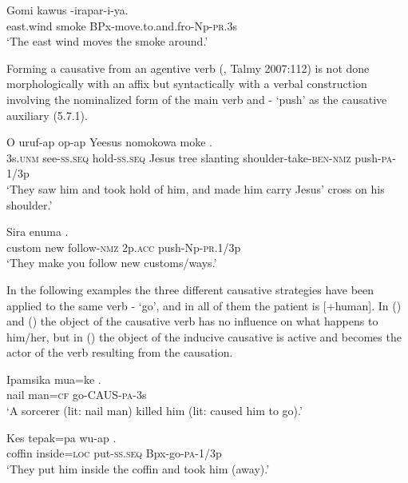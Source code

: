 \ea%
\label{ex:x1000}
\gll Gomi kawus -irapar-i-ya. \\
east.wind smoke BPx-move.to.and.fro-Np-\textsc{pr}.3s\\
\glt`The east wind moves the smoke around.'
\z

Forming a causative from an agentive verb (, Talmy 2007:112) is not done morphologically with an affix but syntactically with a verbal construction involving the nominalized form of the main verb and - `push' as the causative auxiliary (5.7.1). 

\ea%
\label{ex:x1003}
\gll O uruf-ap op-ap Yeesus nomokowa moke  .\\
3s.\textsc{unm} see-\textsc{ss}.\textsc{seq} hold-\textsc{ss}.\textsc{seq} Jesus tree slanting shoulder-take-\textsc{ben}-\textsc{nmz} push-\textsc{pa}-1/3p\\
\glt`They saw him and took hold of him, and made him carry Jesus' cross on his shoulder.'
\z

\ea%
\label{ex:x1002}
\gll Sira enuma   . \\
custom new follow-\textsc{nmz} 2p.\textsc{acc} push-Np-\textsc{pr}.1/3p\\
\glt`They make you follow new customs/ways.'
\z

In the following examples the three different causative strategies have been applied to the same verb - `go', and in all of them the patient is [+human]. In () and () the object of the causative verb has no influence on what happens to him/her, but in () the object of the inducive causative is active and becomes the actor of the verb resulting from the causation. 

\ea%
\label{ex:x1016}
\gll Ipamsika mua=ke . \\
nail man=\textsc{cf} go-CAUS-\textsc{pa}-3s \\
\glt`A sorcerer (lit: nail man) killed him (lit: caused him to go).'
\z

\ea%
\label{ex:x1829}
\gll Kes tepak=pa wu-ap . \\
coffin inside=\textsc{loc} put-\textsc{ss}.\textsc{seq} Bpx-go-\textsc{pa}-1/3p\\
\glt`They put him inside the coffin and took him (away).'
\z

